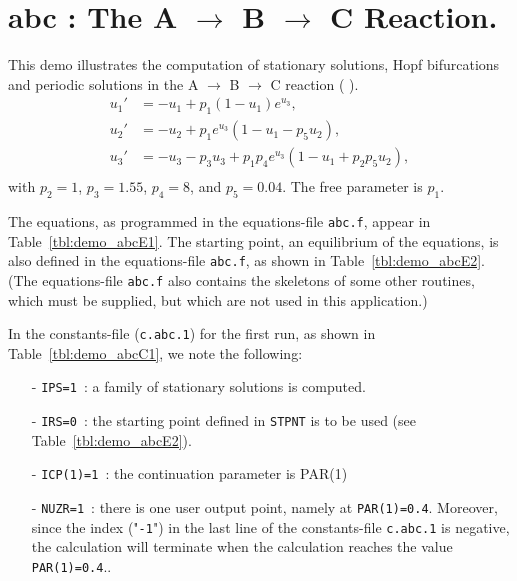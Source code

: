 \documentclass[12pt]{report}
\begin{document}
\section{ abc : The A $\to$ B $\to$ C Reaction.} \label{sec:Demos_abc}
This demo illustrates the computation of 
stationary solutions,
Hopf bifurcations 
and
periodic solutions
in the A $\to$ B $\to$ C reaction 
( \citeyear{DoHe:83}).
\begin{equation} \begin{array}{cl}
  u_1 ' &=  -u_1 + p_1 (1-u_1) e^{u_3}, \\
  u_2 ' &=  -u_2 +  p_1 e^{u_3} ( 1-u_1 - p_5 u_2 ),\\
  u_3 ' &=  -u_3 - p_3 u_3 + p_1 p_4 e^{u_3}  
  ( 1-u_1 + p_2 p_5 u_2 ),\\ \end{array} \end{equation}
with $p_2=1$, $p_3=1.55$, $p_4=8$, and $p_5=0.04$. 
The free parameter is $p_1$.

The equations, as programmed in the equations-file {\tt abc.f},
appear in Table~\ref{tbl:demo_abcE1}.
The starting point, an equilibrium of the equations,
is also defined in  the equations-file {\tt abc.f},
as shown in  Table~\ref{tbl:demo_abcE2}.
(The equations-file {\tt abc.f} also contains the skeletons
of some other routines, which must be supplied, but which 
are not used in this application.)

In the constants-file ({\tt c.abc.1}) for the first run, as shown in 
Table~\ref{tbl:demo_abcC1}, we note the following:

\begin{itemize}
\item[-] {\tt IPS=1}~: a family of stationary solutions is computed.

\item[-] {\tt IRS=0}~: the starting point defined in {\tt STPNT} 
	 is to be used (see  Table~\ref{tbl:demo_abcE2}). 

\item[-] {\tt ICP(1)=1}~: the continuation parameter is PAR(1) 

\item[-] {\tt NUZR=1}~: there is one user output point, namely at
	 {\tt PAR(1)=0.4}. Moreover, since the index ("{\tt -1}") in
	 the last line of the constants-file {\tt c.abc.1} is negative, 
	 the calculation will terminate when the calculation reaches
	 the value {\tt PAR(1)=0.4}..
\end{itemize}
\end{document}
